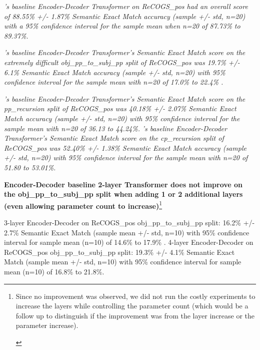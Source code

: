 \documentclass[11pt]{article}
\begin{document}
\textit{\citep{Wu2023}'s baseline Encoder-Decoder Transformer on ReCOGS\_pos had an overall score of  88.55\% +/- 1.87\% Semantic Exact Match accuracy (sample +/- std, n=20) with a 95\% confidence interval for the sample mean when n=20 of 87.73\% to 89.37\%.}

\textit{\citep{Wu2023}'s baseline Encoder-Decoder Transformer's Semantic Exact Match score on the extremely difficult obj\_pp\_to\_subj\_pp split of ReCOGS\_pos was 19.7\% +/- 6.1\% Semantic Exact Match accuracy (sample +/- std, n=20) with 95\% confidence interval for the sample mean with n=20 of 17.0\% to 22.4\% .}

\textit{\citep{Wu2023}'s baseline Encoder-Decoder Transformer's Semantic Exact Match score on the pp\_recursion split of ReCOGS\_pos was 40.18\% +/- 2.07\% Semantic Exact Match accuracy (sample +/- std, n=20) with 95\% confidence interval for the sample mean with n=20 of 36.13 to 44.24\%.} \textit{\citep{Wu2023}'s baseline Encoder-Decoder Transformer's Semantic Exact Match score on the cp\_recursion split of ReCOGS\_pos was 52.40\% +/- 1.38\% Semantic Exact Match accuracy (sample +/- std, n=20) with 95\% confidence interval for the sample mean with n=20 of 51.80 to 53.01\%.}

\textbf{\citep{Wu2023} Encoder-Decoder baseline 2-layer Transformer does not improve on the obj\_pp\_to\_subj\_pp split when adding 1 or 2 additional layers}
\label{wu-baseline-layer-variation-experiment-results}
\textbf{(even allowing parameter count to increase)}\footnote{\begin{footnotesize}Since no improvement was observed, we did not run the costly experiments to increase the layers while controlling the parameter count (which would be a follow up to distinguish if the improvement was from the layer increase or the parameter increase).
\end{footnotesize}
}

3-layer \citep{Wu2023} Encoder-Decoder on ReCOGS\_pos obj\_pp\_to\_subj\_pp split: 16.2\% +/- 2.7\% Semantic Exact Match (sample mean +/- std, n=10) with 95\% confidence interval for sample mean (n=10) of 14.6\% to 17.9\% . 4-layer \citep{Wu2023} Encoder-Decoder on ReCOGS\_pos obj\_pp\_to\_subj\_pp split: 19.3\% +/- 4.1\% Semantic Exact Match (sample mean +/- std, n=10) with 95\% confidence interval for sample mean (n=10) of 16.8\% to 21.8\%.
\end{document}

